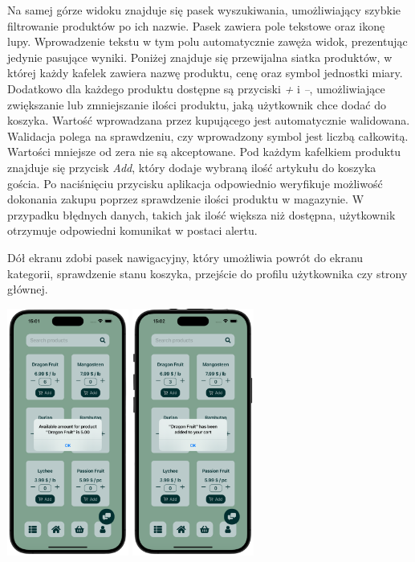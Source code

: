 Na samej górze widoku znajduje się pasek wyszukiwania, umożliwiający szybkie filtrowanie produktów po ich nazwie. Pasek zawiera pole tekstowe oraz ikonę lupy. Wprowadzenie tekstu w tym polu automatycznie zawęża widok, prezentując jedynie pasujące wyniki. Poniżej znajduje się przewijalna siatka produktów, w której każdy kafelek zawiera nazwę produktu, cenę oraz symbol jednostki miary. Dodatkowo dla każdego produktu dostępne są przyciski \textit{+} i \textit{–}, umożliwiające zwiększanie lub zmniejszanie ilości produktu, jaką użytkownik chce dodać do koszyka. Wartość wprowadzana przez kupującego jest automatycznie walidowana. Walidacja polega na sprawdzeniu, czy wprowadzony symbol jest liczbą całkowitą. Wartości mniejsze od zera nie są akceptowane. Pod każdym kafelkiem produktu znajduje się przycisk \textit{Add}, który dodaje wybraną ilość artykułu do koszyka gościa. Po naciśnięciu przycisku aplikacja odpowiednio weryfikuje możliwość dokonania zakupu poprzez sprawdzenie ilości produktu w magazynie. W przypadku błędnych danych, takich jak ilość większa niż dostępna, użytkownik otrzymuje odpowiedni komunikat w postaci alertu. 

Dół ekranu zdobi pasek nawigacyjny, który umożliwia powrót do ekranu kategorii, sprawdzenie stanu koszyka, przejście do profilu użytkownika czy strony głównej.

\begin{center} 
    \includegraphics[width=0.3\textwidth]{images/front/products_amount.png}  
    \includegraphics[width=0.3\textwidth]{images/front/products_added.png}  
\end{center}

